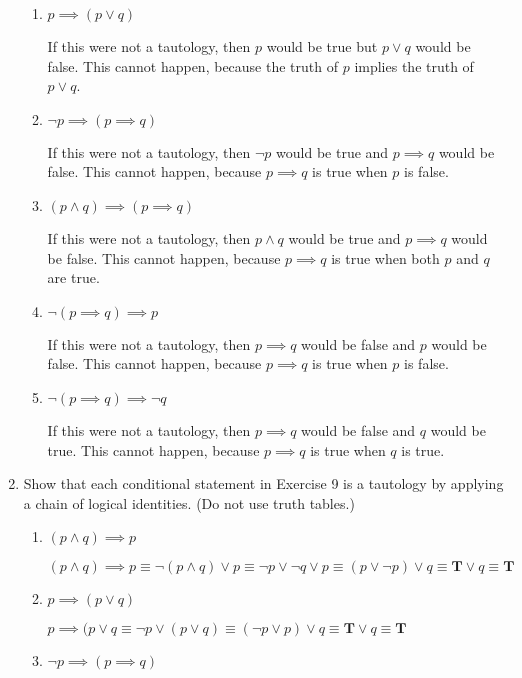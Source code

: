 \documentclass[11pt]{article}
\begin{document}
\begin{enumerate}[label=\textbf{\arabic*.}]
\begin{enumerate}[label=\textbf{\alph*)}]
		\item $p \implies (p \lor q)$
		
		If this were not a tautology, then $p$ would be true but $p \lor q$ would be false. This cannot happen, because the truth of $p$ implies the truth of $p \lor q$.
		
		\item $\neg p \implies (p \implies q)$
		
		If this were not a tautology, then $\neg p$ would be true and $p \implies q$ would be false. This cannot happen, because $p \implies q$ is true when $p$ is false.
		
		\item $(p \land q) \implies (p \implies q)$
		
		If this were not a tautology, then $p \land q$ would be true and $p \implies q$ would be false. This cannot happen, because $p \implies q$ is true when both $p$ and $q$ are true.
		
		\item $\neg(p \implies q) \implies p$
		
		If this were not a tautology, then $p \implies q$ would be false and $p$ would be false. This cannot happen, because $p \implies q$ is true when $p$ is false.
		
		\item $\neg(p \implies q) \implies \neg q$
		
		If this were not a tautology, then $p \implies q$ would be false and $q$ would be true. This cannot happen, because $p \implies q$ is true when $q$ is true.
	\end{enumerate}

	\item Show that each conditional statement in Exercise 9 is a tautology by applying a chain of logical identities. (Do not use truth tables.)
	\begin{enumerate}[label=\textbf{\alph*)}]
		\item $(p \land q) \implies p$
		
		$(p \land q) \implies p \equiv \neg(p \land q) \lor p \equiv \neg p \lor \neg q \lor p \equiv (p \lor \neg p) \lor q \equiv \textbf{T} \lor q \equiv \textbf{T}$
		
		\item $p \implies (p \lor q)$
		
		$p \implies (p \lor q \equiv \neg p \lor (p \lor q) \equiv (\neg p \lor p) \lor q \equiv \textbf{T} \lor q \equiv \textbf{T}$
		
		\item $\neg p \implies (p \implies q)$
		

\end{enumerate}
\end{enumerate}
\end{document}
